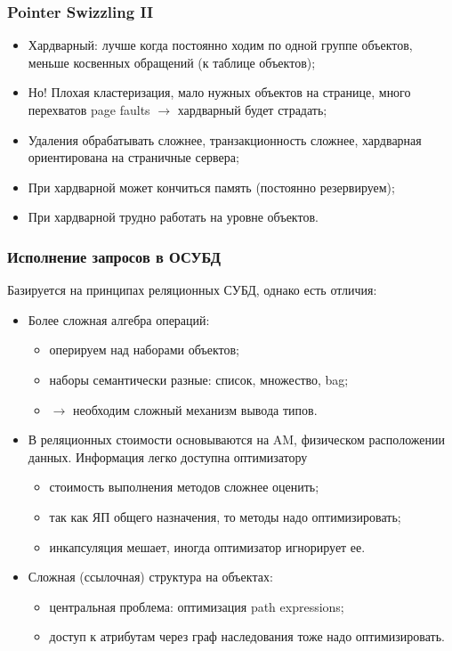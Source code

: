 \documentclass{beamer}
\begin{document}
\begin{frame}
\frametitle{Pointer Swizzling II}

\begin{itemize}
 \setlength\itemsep{1em}
  \item Хардварный: лучше когда постоянно ходим по одной группе объектов, меньше косвенных обращений (к таблице объектов);
  \item Но! Плохая кластеризация, мало нужных объектов на странице, много перехватов page faults $\longrightarrow$ хардварный будет страдать;
  \item Удаления обрабатывать сложнее, транзакционность сложнее, хардварная ориентирована на страничные сервера;
  \item При хардварной может кончиться память (постоянно резервируем);
  \item При хардварной трудно работать на уровне объектов.
\end{itemize}
\end{frame}



\begin{frame}
\frametitle{Исполнение запросов в ОСУБД \cite{Ozsu2011}}
Базируется на принципах реляционных СУБД, однако есть отличия:
\begin{itemize}
  \item Более сложная алгебра операций: 
  \begin{itemize}
    \item оперируем над наборами объектов;
    \item наборы семантически разные: список, множество, bag;
    \item $\longrightarrow$ необходим сложный механизм вывода типов.
  \end{itemize}
  \item В реляционных стоимости основываются на AM, физическом расположении данных. Информация легко доступна оптимизатору
  \begin{itemize}
    \item стоимость выполнения методов сложнее оценить;
    \item так как ЯП общего назначения, то методы надо оптимизировать;
    \item инкапсуляция мешает, иногда оптимизатор игнорирует ее.
  \end{itemize}
  \item Сложная (ссылочная) структура на объектах:
  \begin{itemize}
    \item центральная проблема: оптимизация path expressions;
    \item доступ к атрибутам через граф наследования тоже надо оптимизировать.
  \end{itemize}  
\end{itemize}
\end{frame}
\end{document}
